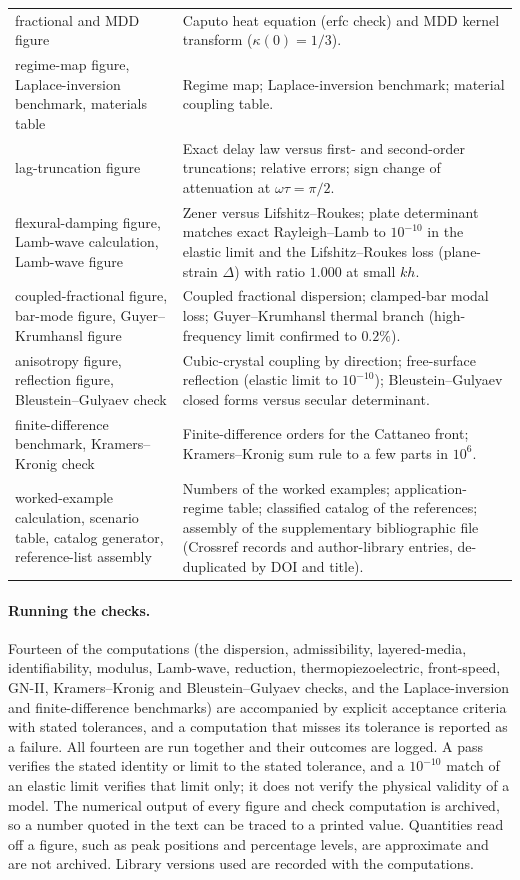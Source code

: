 \begin{table}[H]
\begin{tabularx}{\textwidth}{@{}p{5.2cm}X@{}}
fractional and MDD figure & Caputo heat equation (erfc check) and MDD kernel transform ($\kappa(0)=1/3$).\\
regime-map figure, Laplace-inversion benchmark, materials table & Regime map; Laplace-inversion benchmark; material coupling table.\\
lag-truncation figure & Exact delay law versus first- and second-order truncations; relative errors; sign change of attenuation at $\omega\tau=\pi/2$.\\
flexural-damping figure, Lamb-wave calculation, Lamb-wave figure & Zener versus Lifshitz--Roukes; plate determinant matches exact Rayleigh--Lamb to $10^{-10}$ in the elastic limit and the Lifshitz--Roukes loss (plane-strain $\Delta$) with ratio $1.000$ at small $kh$.\\
coupled-fractional figure, bar-mode figure, Guyer--Krumhansl figure & Coupled fractional dispersion; clamped-bar modal loss; Guyer--Krumhansl thermal branch (high-frequency limit confirmed to $0.2\%$).\\
anisotropy figure, reflection figure, Bleustein--Gulyaev check & Cubic-crystal coupling by direction; free-surface reflection (elastic limit to $10^{-10}$); Bleustein--Gulyaev closed forms versus secular determinant.\\
finite-difference benchmark, Kramers--Kronig check & Finite-difference orders for the Cattaneo front; Kramers--Kronig sum rule to a few parts in $10^{6}$.\\
worked-example calculation, scenario table, catalog generator, reference-list assembly & Numbers of the worked examples; application-regime table; classified catalog of the references; assembly of the supplementary bibliographic file (Crossref records and author-library entries, de-duplicated by DOI and title).\\
\bottomrule\end{tabularx}
\end{table}
\paragraph{Running the checks.} Fourteen of the computations (the dispersion, admissibility, layered-media, identifiability, modulus, Lamb-wave, reduction, thermopiezoelectric, front-speed, GN-II, Kramers--Kronig and Bleustein--Gulyaev checks, and the Laplace-inversion and finite-difference benchmarks) are accompanied by explicit acceptance criteria with stated tolerances, and a computation that misses its tolerance is reported as a failure. All fourteen are run together and their outcomes are logged. A pass verifies the stated identity or limit to the stated tolerance, and a $10^{-10}$ match of an elastic limit verifies that limit only; it does not verify the physical validity of a model. The numerical output of every figure and check computation is archived, so a number quoted in the text can be traced to a printed value. Quantities read off a figure, such as peak positions and percentage levels, are approximate and are not archived. Library versions used are recorded with the computations.
